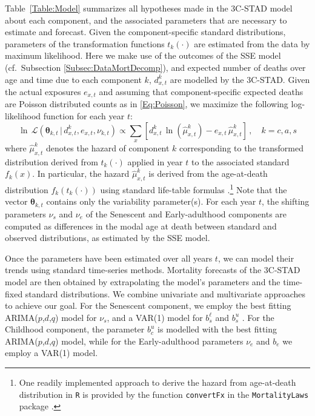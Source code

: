 \documentclass[11pt, a4paper]{article}
\begin{document}
Table~\ref{Table:Model} summarizes all hypotheses made in the 3C-STAD model about each component, and the associated parameters that are necessary to estimate and forecast. Given the component-specific standard distributions, parameters of the transformation functions $t_{k}(\cdot)$ are estimated from the data by maximum likelihood. Here we make use of the outcomes of the SSE model (cf.~Subsection \ref{Subsec:DataMortDecomp}), and expected number of deaths over age and time due to each component $k$, $d^{k}_{x,t}$ are modelled by the 3C-STAD. Given the actual exposures $e_{x,t}$ and assuming that component-specific expected deaths are Poisson distributed counts as in \eqref{Eq:Poisson}, we maximize the following log-likelihood function for each year $t$:
% 
\begin{equation}\label{Eq:PoiLogLike}
\ln \, \mathcal{L}\left(\bm{\theta}_{k,t}\,|\, d^{k}_{x,t} , e_{x,t} , \nu_{k,t} \right) \propto \sum_{x} \left[  d^{k}_{x,t} \,
\ln \left ( \hat{\mu}^{k}_{x,t}  \right ) - e_{x,t}
\, \hat{\mu}^{k}_{x,t}  \right]  \,, \quad k=c,a,s 
\end{equation}
%
where $\hat{\mu}^{k}_{x,t}$ denotes the hazard of component $k$ corresponding to the transformed distribution derived from $t_{k}(\cdot)$ applied in year $t$ to the associated standard $f_{k}(x)$. In particular, the hazard $\hat{\mu}^k_{x,t}$ is derived from the age-at-death distribution $f_{k}(t_k(\cdot))$ using standard life-table formulas \citep{preston2001demogr}.\footnote{One readily implemented approach to derive the hazard from age-at-death distribution in \texttt{R} is provided by the function \texttt{convertFx} in the \texttt{MortalityLaws} package  \citep{pascariu2018mortalitylaws}.} Note that the vector $\bm{\theta}_{k,t}$ contains only the variability parameter(s). For each year $t$, the shifting parameters $\nu_{s}$ and $\nu_{e}$ of the Senescent and Early-adulthood components are computed as differences in the modal age at death between standard and observed distributions, as estimated by the SSE model. 

Once the parameters have been estimated over all years $t$, we can model their trends using standard time-series methods. Mortality forecasts of the 3C-STAD model are then obtained by extrapolating the model's parameters and the time-fixed standard distributions. We combine univariate and multivariate approaches to achieve our goal. For the Senescent component, we employ the best fitting ARIMA($p$,$d$,$q$) model for $\nu_{s}$, and a VAR(1) model for $b^{\ell}_{s}$ and $b^{u}_{s}$ \cite[as in][]{basellini2019stad}. For the Childhood component, the parameter $b_{c}^{u}$ is modelled with the best fitting ARIMA($p$,$d$,$q$) model, while for the Early-adulthood parameters $\nu_{e}$ and $b_{e}$ we employ a VAR(1) model.
\end{document}
